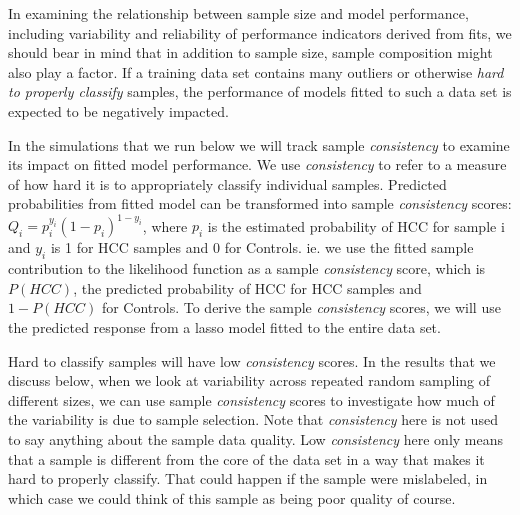 \documentclass[
]{book}
\begin{document}
In examining the relationship between sample size and
model performance, including variability and reliability
of performance indicators derived from fits, we should bear in
mind that in addition to sample size, sample composition might
also play a factor. If a training data set contains many outliers
or otherwise \emph{hard to properly classify} samples, the performance
of models fitted to such a data set is expected to be negatively impacted.

In the simulations that we run below we will track sample \emph{consistency}
to examine its impact on fitted model performance. We use
\emph{consistency} to refer to a measure of how hard it is to
appropriately classify individual samples.
Predicted probabilities from fitted model can be transformed into sample
\emph{consistency} scores: \(Q_i = p_i^{y_i}(1-p_i)^{1-y_i}\), where \(p_i\) is the
estimated probability of HCC for sample i and \(y_i\) is 1 for HCC samples and
0 for Controls. ie. we use the fitted sample contribution to the
likelihood function as a sample \emph{consistency} score,
which is \(P(HCC)\), the predicted probability of HCC for HCC samples
and \(1 - P(HCC)\) for Controls. To derive the sample \emph{consistency} scores,
we will use the predicted response from a lasso model fitted to the entire data set.

Hard to classify samples will have low \emph{consistency} scores.
In the results that we discuss below, when we look at variability across repeated
random sampling of different sizes, we can use sample \emph{consistency} scores to investigate
how much of the variability is due to sample selection.
Note that \emph{consistency} here is not used to say anything about the sample data quality.
Low \emph{consistency} here only means that a sample is different from the
core of the data set in a way that makes it hard to properly classify.
That could happen if the sample were mislabeled, in which case we could
think of this sample as being poor quality of course.
\end{document}
